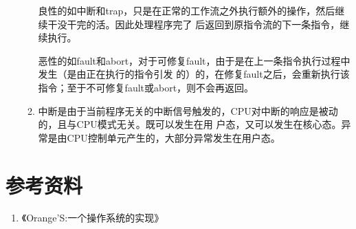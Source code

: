 \documentclass[a4paper]{article}
\begin{document}
\begin{enumerate}
\begin{enumerate}
            良性的如中断和trap，只是在正常的工作流之外执行额外的操作，然后继续干没干完的活。因此处理程序完了                后返回到原指令流的下一条指令，继续执行。
            
            恶性的如fault和abort，对于可修复fault，由于是在上一条指令执行过程中发生（是由正在执行的指令引发                的）的，在修复fault之后，会重新执行该指令；至于不可修复fault或abort，则不会再返回。
         \item 中断是由于当前程序无关的中断信号触发的，CPU对中断的响应是被动的，且与CPU模式无关。既可以发生在用 户态，又可以发生在核心态。异常是由CPU控制单元产生的，大部分异常发生在用户态。
         \end{enumerate}
\end{enumerate}

\section{参考资料}
	\begin{enumerate}
		\item 《Orange'S:一个操作系统的实现》
	\end{enumerate}
\end{document}
